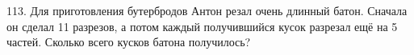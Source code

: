 113. Для приготовления бутербродов Антон резал очень длинный батон. Сначала он сделал 11 разрезов, а потом каждый получившийся кусок разрезал ещё на 5 частей. Сколько всего кусков батона получилось?\\
